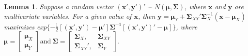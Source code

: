 \documentclass[12pt]{article}
\newtheorem{lemma}{Lemma}%
\begin{document}
\begin{lemma}{}{\label{lemma:max}}
Suppose a random vector $(\bm x', \bm y')' \sim N(\bm \mu, \bm \Sigma)$, where $\bm x$ and $\bm y$ are multivariate variables.
For a given value of $\bm x$, then $\bm y = \bm \mu_{Y} + \bm \Sigma_{XY}' \bm \Sigma_{X}^{-1} (\bm x - \bm \mu_{X})$ maximizes exp$\{ -\frac{1}{2}[(\bm x', \bm y') - \bm \mu'] \bm \Sigma^{-1} [(\bm x', \bm y')' - \bm \mu] \}$, where
$\bm \mu = \left[
\begin{array}{cc}
\bm \mu_{X} \\
\bm \mu_{Y}
\end{array}\right] \mbox{and} ~
\bm \Sigma= \left[
\begin{array}{cc}
\bm \Sigma_{X},      & \bm \Sigma_{XY} \\
\bm \Sigma_{XY}',   & \bm \Sigma_{Y}
\end{array}\right]$.
\end{lemma}
\end{document}
